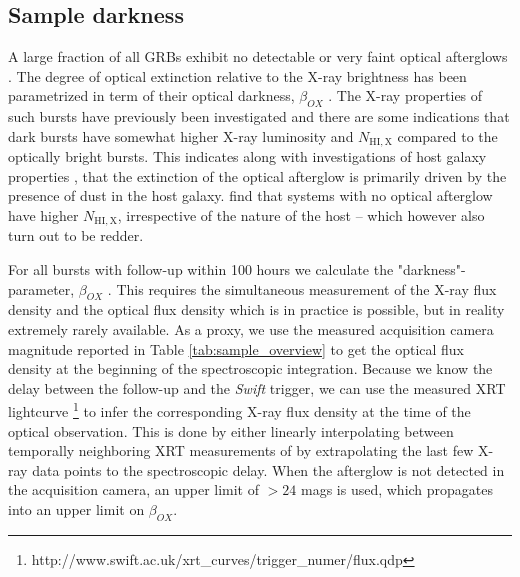 \documentclass{aa}    %
\begin{document}
\subsection{Sample darkness} \label{darkness}

A large fraction of all GRBs exhibit no detectable or very faint optical
afterglows \citep{Groot1998, Djorgovski2001, Fynbo2001}. The degree of optical
extinction relative to the X-ray brightness has been parametrized in term of
their optical darkness, $\beta_{OX}$ \citep{Jakobsson2004, Rol2005,
	VanderHorst2009}. The X-ray properties of such bursts have previously been
investigated \citep{DePasquale2003, Fynbo2009, Melandri2012} and there are some
indications that dark bursts have somewhat higher X-ray luminosity and
$N_{\mathrm{HI, X}}$ compared to the optically bright bursts. This indicates
along with investigations of host galaxy properties \citep{Greiner2011,
	Kruhler2011, Hjorth2012, Perley2016b}, that the extinction of the optical
afterglow is primarily driven by the presence of dust in the host galaxy.
\citet{Hjorth2012} find that systems with no optical afterglow have higher
$N_{\mathrm{HI, X}}$, irrespective of the nature of the host -- which however
also turn out to be redder.

For all bursts with follow-up within 100 hours we calculate the
"darkness"-parameter, $\beta_{OX}$ \citep{Jakobsson2004}. This requires the
simultaneous measurement of the X-ray flux density and the optical flux density
which is in practice is possible, but in reality extremely rarely available. As
a proxy, we use the measured acquisition camera magnitude reported in Table
\ref{tab:sample_overview} to get the optical flux density at the beginning of
the spectroscopic integration. Because we know the delay between the follow-up
and the \textit{Swift} trigger, we can use the measured XRT lightcurve
\citep{Evans2007,
	Evans2009}\footnote{http://www.swift.ac.uk/xrt\_curves/trigger\_numer/flux.qdp}
to infer the corresponding X-ray flux density at the time of the optical
observation. This is done by either linearly interpolating between temporally
neighboring XRT measurements of by extrapolating the last few X-ray data points
to the spectroscopic delay. When the afterglow is not detected in the
acquisition camera, an upper limit of $> 24$ mags is used, which propagates into
an upper limit on $\beta_{OX}$.
\end{document}
